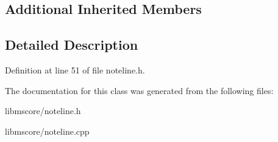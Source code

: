 \subsection*{Additional Inherited Members}


\subsection{Detailed Description}


Definition at line 51 of file noteline.\+h.



The documentation for this class was generated from the following files\+:\begin{DoxyCompactItemize}
\item 
libmscore/noteline.\+h\item 
libmscore/noteline.\+cpp\end{DoxyCompactItemize}
